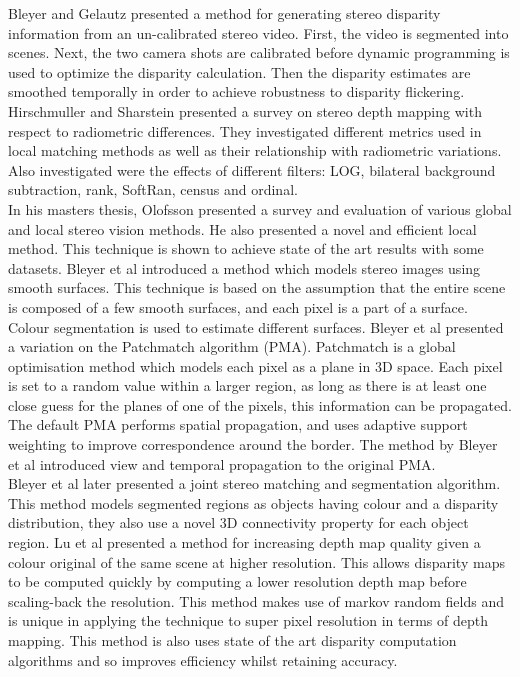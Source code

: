 Bleyer and Gelautz \cite{Bleyer09Temporally} presented a method for generating stereo disparity information from an un-calibrated stereo video. First, the video is segmented into scenes. Next, the two camera shots are calibrated before dynamic programming is used to optimize the disparity calculation. Then the disparity estimates are smoothed temporally in order to achieve robustness to disparity flickering. Hirschmuller and Sharstein \cite{Hirschmuller09Evaluation} presented a survey on stereo depth mapping with respect to radiometric differences. They investigated different metrics used in local matching methods as well as their relationship with radiometric variations. Also investigated were the effects of different filters: LOG, bilateral background subtraction, rank, SoftRan, census and ordinal. \\


In his masters thesis, Olofsson \cite{Olofsson10Modern} presented a survey and evaluation of various global and local stereo vision methods. He also presented a novel and efficient local method. This technique is shown to achieve state of the art results with some datasets. Bleyer et al \cite{Bleyer10Surface} introduced a method which models stereo images using smooth surfaces. This technique is based on the assumption that the entire scene is composed of a few smooth surfaces, and each pixel is a part of a surface. Colour segmentation is used to estimate different surfaces. Bleyer et al \cite{Bleyer11Patchmatch} presented a variation on the Patchmatch algorithm (PMA). Patchmatch is a global optimisation method which models each pixel as a plane in 3D space. Each pixel is set to a random value within a larger region, as long as there is at least one close guess for the planes of one of the pixels, this information can be propagated. The default PMA performs spatial propagation, and uses adaptive support weighting to improve correspondence around the border. The method by Bleyer et al introduced view and temporal propagation to the original PMA. \\


Bleyer et al \cite{Bleyer11Object} later presented a joint stereo matching and segmentation algorithm. This method models segmented regions as objects having colour and a disparity distribution, they also use a novel 3D connectivity property for each object region. Lu et al \cite{Lu11Revisit} presented a method for increasing depth map quality given a colour original of the same scene at higher resolution. This allows disparity maps to be computed quickly by computing a lower resolution depth map before scaling-back the resolution. This method makes use of markov random fields and is unique in applying the technique to super pixel resolution in terms of depth mapping. This method is also uses state of the art disparity computation algorithms and so improves efficiency whilst retaining accuracy. \\ 


